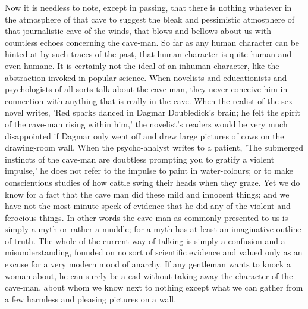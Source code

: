 Now it is needless to note, except in passing, that there is nothing whatever in the atmosphere of that cave to suggest the bleak and pessimistic atmosphere of that journalistic cave of the winds, that blows and bellows about us with countless echoes concerning the cave-man. So far as any human character can be hinted at by such traces of the past, that human character is quite human and even humane. It is certainly not the ideal of an inhuman character, like the abstraction invoked in popular science. When novelists and educationists and psychologists of all sorts talk about the cave-man, they never conceive him in connection with anything that is really in the cave. When the realist of the sex novel writes, 'Red sparks danced in Dagmar Doubledick's brain; he felt the spirit of the cave-man rising within him,' the novelist's readers would be very much disappointed if Dagmar only went off and drew large pictures of cows on the drawing-room wall. When the psycho-analyst writes to a patient, 'The submerged instincts of the cave-man are doubtless prompting you to gratify a violent impulse,' he does not refer to the impulse to paint in water-colours; or to make conscientious studies of how cattle swing their heads when they graze. Yet we do know for a fact that the cave man did these mild and innocent things; and we have not the most minute speck of evidence that he did any of the violent and ferocious things. In other words the cave-man as commonly presented to us is simply a myth or rather a muddle; for a myth has at least an imaginative outline of truth. The whole of the current way of talking is simply a confusion and a misunderstanding, founded on no sort of scientific evidence and valued only as an excuse for a very modern mood of anarchy. If any gentleman wants to knock a woman about, he can surely be a cad without taking away the character of the cave-man, about whom we know next to nothing except what we can gather from a few harmless and pleasing pictures on a wall.

